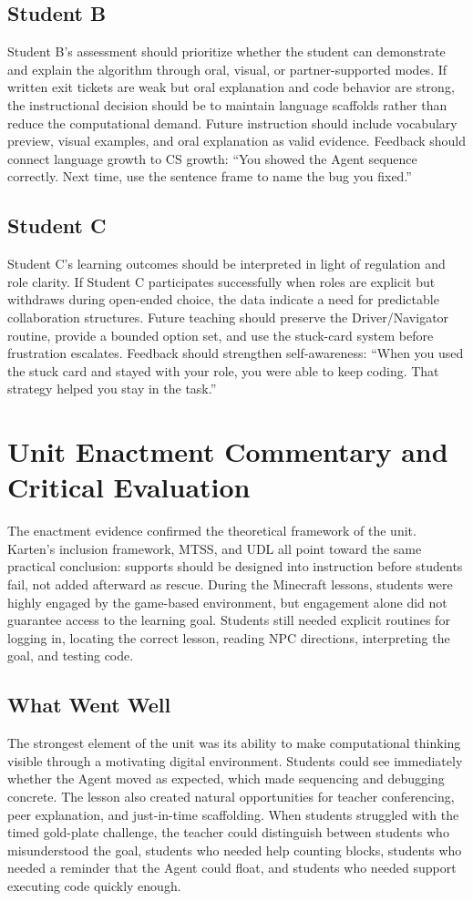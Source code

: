 \documentclass[12pt]{article}
\begin{document}
\subsection{Student B}
Student B's assessment should prioritize whether the student can demonstrate and explain the algorithm through oral, visual, or partner-supported modes. If written exit tickets are weak but oral explanation and code behavior are strong, the instructional decision should be to maintain language scaffolds rather than reduce the computational demand. Future instruction should include vocabulary preview, visual examples, and oral explanation as valid evidence. Feedback should connect language growth to CS growth: ``You showed the Agent sequence correctly. Next time, use the sentence frame to name the bug you fixed.''

\subsection{Student C}
Student C's learning outcomes should be interpreted in light of regulation and role clarity. If Student C participates successfully when roles are explicit but withdraws during open-ended choice, the data indicate a need for predictable collaboration structures. Future teaching should preserve the Driver/Navigator routine, provide a bounded option set, and use the stuck-card system before frustration escalates. Feedback should strengthen self-awareness: ``When you used the stuck card and stayed with your role, you were able to keep coding. That strategy helped you stay in the task.''

\section{Unit Enactment Commentary and Critical Evaluation}
The enactment evidence confirmed the theoretical framework of the unit. Karten's inclusion framework, MTSS, and UDL all point toward the same practical conclusion: supports should be designed into instruction before students fail, not added afterward as rescue. During the Minecraft lessons, students were highly engaged by the game-based environment, but engagement alone did not guarantee access to the learning goal. Students still needed explicit routines for logging in, locating the correct lesson, reading NPC directions, interpreting the goal, and testing code.

\subsection{What Went Well}
The strongest element of the unit was its ability to make computational thinking visible through a motivating digital environment. Students could see immediately whether the Agent moved as expected, which made sequencing and debugging concrete. The lesson also created natural opportunities for teacher conferencing, peer explanation, and just-in-time scaffolding. When students struggled with the timed gold-plate challenge, the teacher could distinguish between students who misunderstood the goal, students who needed help counting blocks, students who needed a reminder that the Agent could float, and students who needed support executing code quickly enough.
\end{document}
